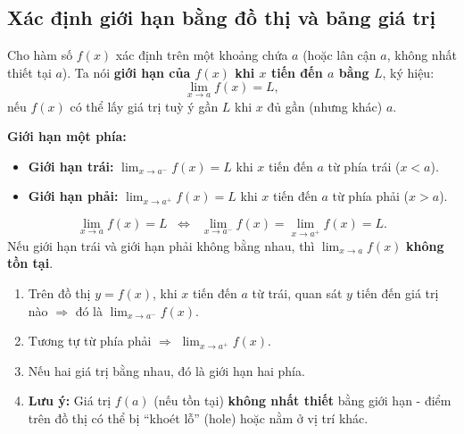 \documentclass[12pt,a4paper]{article}
\begin{document}
\subsection{Xác định giới hạn bằng đồ thị và bảng giá trị}

\begin{dinhnghia}[title={Giới hạn của hàm số}]
  Cho hàm số $f(x)$ xác định trên một khoảng chứa $a$ (hoặc lân cận $a$, không nhất thiết tại $a$). Ta nói \textbf{giới hạn của $f(x)$ khi $x$ tiến đến $a$ bằng $L$}, ký hiệu:
  \[
    \lim_{x \to a} f(x) = L,
  \]
  nếu $f(x)$ có thể lấy giá trị tuỳ ý gần $L$ khi $x$ đủ gần (nhưng khác) $a$.

  \medskip
  \textbf{Giới hạn một phía:}
  \begin{itemize}
    \item \textbf{Giới hạn trái:} $\displaystyle\lim_{x \to a^-} f(x) = L$ khi $x$ tiến đến $a$ từ phía trái ($x < a$).
    \item \textbf{Giới hạn phải:} $\displaystyle\lim_{x \to a^+} f(x) = L$ khi $x$ tiến đến $a$ từ phía phải ($x > a$).
  \end{itemize}
\end{dinhnghia}

\begin{dinhly}[title={Điều kiện tồn tại giới hạn hai phía}]
  \[
    \lim_{x \to a} f(x) = L \;\;\Longleftrightarrow\;\; \lim_{x \to a^-} f(x) = \lim_{x \to a^+} f(x) = L.
  \]
  Nếu giới hạn trái và giới hạn phải không bằng nhau, thì $\displaystyle\lim_{x \to a} f(x)$ \textbf{không tồn tại}.
\end{dinhly}

\begin{phuongphap}[title={Đọc giới hạn từ đồ thị}]
  \begin{enumerate}
    \item Trên đồ thị $y = f(x)$, khi $x$ tiến đến $a$ từ trái, quan sát $y$ tiến đến giá trị nào $\Rightarrow$ đó là $\displaystyle\lim_{x \to a^-} f(x)$.
    \item Tương tự từ phía phải $\Rightarrow$ $\displaystyle\lim_{x \to a^+} f(x)$.
    \item Nếu hai giá trị bằng nhau, đó là giới hạn hai phía.
    \item \textbf{Lưu ý:} Giá trị $f(a)$ (nếu tồn tại) \textbf{không nhất thiết} bằng giới hạn - điểm trên đồ thị có thể bị ``khoét lỗ'' (hole) hoặc nằm ở vị trí khác.
  \end{enumerate}
\end{phuongphap}
\end{document}

